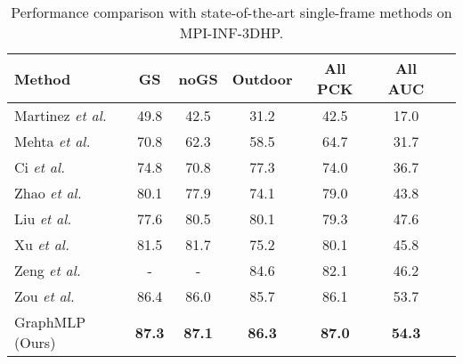 \documentclass[lettersize,journal]{IEEEtran}
\begin{document}
\begin{table}[tb]
  \centering
  \caption
  {
    Performance comparison with state-of-the-art single-frame methods on MPI-INF-3DHP. 
  }
  \setlength{\tabcolsep}{1.00mm} 
  \begin{tabular}{@{}l|cccccc@{}}
  \toprule
  Method &GS  &noGS  &Outdoor  &All PCK  &All AUC  \\

  \midrule
  Martinez \emph{et al.}~\cite{simplebaseline} &49.8 &42.5 &31.2 &42.5 &17.0 \\

  Mehta \emph{et al.}~\cite{mehta2017monocular} &70.8 &62.3 &58.5 &64.7 &31.7 \\

  Ci \emph{et al.}~\cite{ci2019optimizing} &74.8 &70.8 &77.3 &74.0 &36.7 \\

  Zhao \emph{et al.}~\cite{zhao2022graformer} &80.1 &77.9 &74.1 &79.0 &43.8 \\

  Liu \emph{et al.}~\cite{liu2020comprehensive} &77.6 &80.5 &80.1 &79.3 &47.6 \\

  Xu \emph{et al.}~\cite{xu2021graph} &81.5 &81.7 &75.2 &80.1 &45.8 \\

  Zeng \emph{et al.}~\cite{zeng2021learning} &- &- &84.6 &82.1 &46.2 \\

  Zou \emph{et al.}~\cite{zou2021modulated} &86.4 &86.0 &85.7 &86.1 &53.7 \\

  \midrule
  GraphMLP (Ours) &\textbf{87.3} &\textbf{87.1} &\textbf{86.3} &\textbf{87.0} &\textbf{54.3} \\

  \bottomrule
  \end{tabular}
  \label{table:3dhp}
\end{table}
\end{document}

